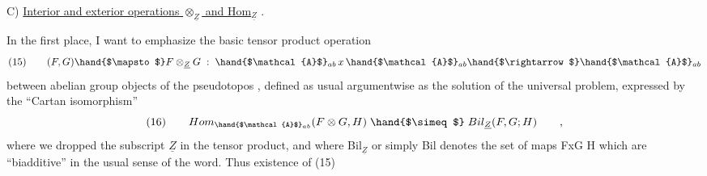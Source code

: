 C) \quad \uline{Interior and exterior operations $\otimes_{\underline{Z}}$ and Hom$_{\underline{Z}}$} .

In the first place, I want to emphasize the basic tensor product
operation
\[ (15) \qquad (F,G) \hand{$\mapsto$} F\otimes_{\underline{Z}}G \; : \; \hand{$\mathcal{A}$}_{ab} \, x \, \hand{$\mathcal{A}$}_{ab} \hand{$\rightarrow$} \hand{$\mathcal{A}$}_{ab} \]
between abelian group objects of the pseudotopos , defined as usual
argumentwise as the solution of the universal problem, expressed by the
``Cartan isomorphism''
\[ (16) \qquad Hom_{\hand{$\mathcal{A}$}_{ab}}(F\otimes G,H) \; \hand{$\simeq$} \; Bil_{\underline{Z}}(F,G;H) \qquad , \]
where we dropped the subscript $\underline{Z}$ in the tensor product, and where
Bil$_{\underline{Z}}$ or simply Bil denotes the set of maps FxG \hand{$\longrightarrow$} H which are
``biadditive'' in the usual sense of the word. Thus existence of (15)

